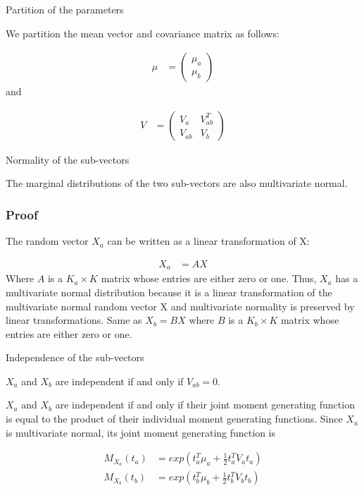 \documentclass[11pt]{article} %
\begin{document}
Partition of the parameters

We partition the mean vector and covariance matrix as follows:

\begin{align*}
	\mu &= \begin{pmatrix}
		\mu_a \\
		\mu_b
	\end{pmatrix}
\end{align*}
and 

\begin{align*}
	V &= \begin{pmatrix}
		V_a & V_{ab}^T \\
		V_{ab} & V_b
	\end{pmatrix}
\end{align*}

Normality of the sub-vectors

The marginal distributions of the two sub-vectors are also multivariate normal.

\subsubsection{Proof}
The random vector $X_a$ can be written as a linear transformation of X:

\begin{align*}
	X_a &= A X
\end{align*}
Where $A$ is a $K_a \times K$ matrix whose entries are either zero or one. Thus, $X_a $ has a multivariate normal distribution because it is a linear transformation of the multivariate normal random vector X and multivariate normality is preserved by linear transformations. Same as $X_b = B X$ where $B$ is a $K_b \times K$ matrix whose entries are either zero or one. 



Independence of the sub-vectors

$X_a$ and $X_b$ are independent if and only if $V_{ab} = 0$.

$X_a$ and $X_b$ are independent if and only if their joint moment generating function is equal to the product of their individual moment generating functions. Since $X_a$ is multivariate normal, its joint moment generating function is 

\begin{align*}
	M_{X_a}(t_a) &= exp(t^T_a \mu_a + \frac{1}{2} t_a^T V_a t_a) \\
	M_{X_b}(t_b) &= exp(t^T_b \mu_b + \frac{1}{2} t_b^T V_b t_b) 
\end{align*}
\end{document}
